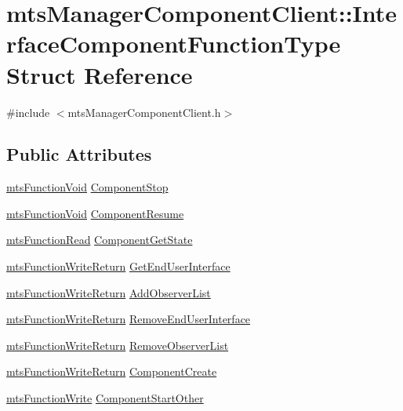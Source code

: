 \hypertarget{structmts_manager_component_client_1_1_interface_component_function_type}{}\section{mts\+Manager\+Component\+Client\+:\+:Interface\+Component\+Function\+Type Struct Reference}
\label{structmts_manager_component_client_1_1_interface_component_function_type}


{\ttfamily \#include $<$mts\+Manager\+Component\+Client.\+h$>$}

\subsection*{Public Attributes}
\begin{DoxyCompactItemize}
\item 
\hyperlink{classmts_function_void}{mts\+Function\+Void} \hyperlink{structmts_manager_component_client_1_1_interface_component_function_type_aed082c4c86dba8014954221109f7c58f}{Component\+Stop}
\item 
\hyperlink{classmts_function_void}{mts\+Function\+Void} \hyperlink{structmts_manager_component_client_1_1_interface_component_function_type_a496db822592a853aa677182211beb6e0}{Component\+Resume}
\item 
\hyperlink{classmts_function_read}{mts\+Function\+Read} \hyperlink{structmts_manager_component_client_1_1_interface_component_function_type_abefd4a2d50f822ea0ecf8326c029e0bd}{Component\+Get\+State}
\item 
\hyperlink{classmts_function_write_return}{mts\+Function\+Write\+Return} \hyperlink{structmts_manager_component_client_1_1_interface_component_function_type_a70bfbf721a72448bd92a65886155356a}{Get\+End\+User\+Interface}
\item 
\hyperlink{classmts_function_write_return}{mts\+Function\+Write\+Return} \hyperlink{structmts_manager_component_client_1_1_interface_component_function_type_af4546cad19d98c11d2022d4ac060d344}{Add\+Observer\+List}
\item 
\hyperlink{classmts_function_write_return}{mts\+Function\+Write\+Return} \hyperlink{structmts_manager_component_client_1_1_interface_component_function_type_ac1bcafb0280bd20b56a89bade8f7172e}{Remove\+End\+User\+Interface}
\item 
\hyperlink{classmts_function_write_return}{mts\+Function\+Write\+Return} \hyperlink{structmts_manager_component_client_1_1_interface_component_function_type_a199fcb11e739ade7ff2b787b899ac5c3}{Remove\+Observer\+List}
\item 
\hyperlink{classmts_function_write_return}{mts\+Function\+Write\+Return} \hyperlink{structmts_manager_component_client_1_1_interface_component_function_type_a0ca3f74d401e16140df73ed6d68d3781}{Component\+Create}
\item 
\hyperlink{classmts_function_write}{mts\+Function\+Write} \hyperlink{structmts_manager_component_client_1_1_interface_component_function_type_a20331f3febb16921a0e90842eb8e31fd}{Component\+Start\+Other}
\end{DoxyCompactItemize}


